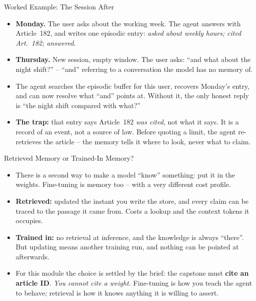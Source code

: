 \begin{frame}{Worked Example: The Session After}
\small
\begin{itemize}
  \item \textbf{Monday.} The user asks about the working week. The agent answers with Article~182, and writes one episodic entry: \emph{asked about weekly hours; cited Art.~182; answered}.
  \pause
  \item \textbf{Thursday.} New session, empty window. The user asks: ``and what about the night shift?'' -- ``and'' referring to a conversation the model has no memory of.
  \pause
  \item The agent searches the episodic buffer for this user, recovers Monday's entry, and can now resolve what ``and'' points at. Without it, the only honest reply is ``the night shift compared with what?''
  \pause
  \item \textbf{The trap:} that entry says Article~182 \emph{was cited}, not what it says. It is a record of an event, not a source of law. Before quoting a limit, the agent re-retrieves the article -- the memory tells it where to look, never what to claim.
\end{itemize}
\end{frame}

\begin{frame}{Retrieved Memory or Trained-In Memory?}
\begin{itemize}
  \item There is a second way to make a model ``know'' something: put it in the weights. Fine-tuning is memory too -- with a very different cost profile.
  \pause
  \item \textbf{Retrieved:} updated the instant you write the store, and every claim can be traced to the passage it came from. Costs a lookup and the context tokens it occupies.
  \pause
  \item \textbf{Trained in:} no retrieval at inference, and the knowledge is always ``there''. But updating means another training run, and nothing can be pointed at afterwards.
  \pause
  \item For this module the choice is settled by the brief: the capstone must \textbf{cite an article ID}. \emph{You cannot cite a weight.} Fine-tuning is how you teach the agent to behave; retrieval is how it knows anything it is willing to assert.
\end{itemize}
\end{frame}

